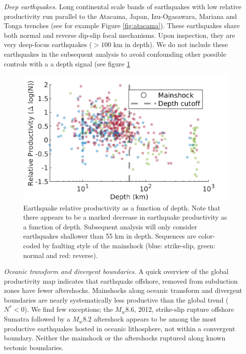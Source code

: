 \documentclass[12pt, notitlepage]{report}
\begin{document}
\textit{Deep earthquakes.} Long continental scale bands of earthquakes with low relative productivity run parallel to the Atacama, Japan, Izu-Ogasawara, Mariana and Tonga trenches (see for example Figure \ref{fig:atacama}). These earthquakes share both normal and reverse dip-slip focal mechanisms. Upon inspection, they are very deep-focus earthquakes ($>100$ km in depth). We do not include these earthquakes in the subsequent analysis to avoid confounding other possible controls with a  a depth signal (see figure \ref{fig:prod_vs_depth}

\begin{figure}
    \centering
    \includegraphics{figures/prod_vs_depth.png}
    \caption{Earthquake relative productivity as a function of depth. Note that there appears to be a marked decrease in earthquake productivity as a function of depth. Subsequent analysis will only consider earthquakes shallower than 55 km in depth. Sequences are color-coded by faulting style of the mainshock (blue: strike-slip, green: normal and red: reverse).}
    \label{fig:prod_vs_depth}
\end{figure}

\textit{Oceanic transform and divergent boundaries.} A quick overview of the global productivity map indicates that earthquake offshore, removed from subduction zones have fewer aftershocks. Mainshocks along oceanic transform and divergent boundaries are nearly systematically less productive than the global trend ($N^*<0$). We find few exceptions; the $M_w8.6$, 2012, strike-slip rupture offshore Sumatra followed by a $M_w8.2$ aftershock appears to be among the most productive earthquakes hosted in oceanic lithosphere, not within a convergent boundary. Neither the mainshock or the aftershocks ruptured along known tectonic boundaries. %
\end{document}
